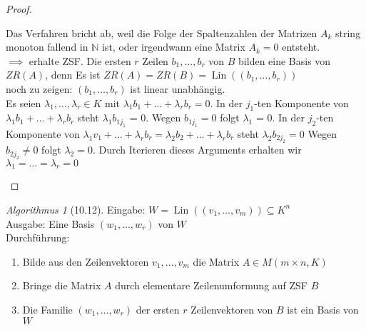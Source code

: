 \documentclass[a4paper]{scrartcl}
\DeclareMathOperator{\Lin}{Lin}
\theoremstyle{definition}
\theoremstyle{plain}
\theoremstyle{plain}
\theoremstyle{remark}
\theoremstyle{remark}
\theoremstyle{remark}
\theoremstyle{remark}
\newtheorem{algorithm}{Algorithmus}
\theoremstyle{remark}
\begin{document}
\begin{proof}
\begin{enumerate}
\begin{enumerate}
Das Verfahren bricht ab, weil die Folge der Spaltenzahlen der Matrizen $A_k$ string monoton fallend in $\mathbb{N}$ ist, oder irgendwann eine Matrix $A_k = 0$ entsteht. \\
                $\implies$ erhalte ZSF.
Die ersten $r$ Zeilen $b_1, \ldots, b_r$ von $B$ bilden eine Basis von $ZR(A)$, denn Es ist $ZR(A) = ZR(B) = \Lin((b_1, \ldots, b_r))$ \\
                noch zu zeigen: $(b_1, \ldots, b_r)$ ist linear unabhängig. \\
                Es seien $\lambda_1, \dots, \lambda_r \in K$ mit $\lambda_1 b_1 + \ldots + \lambda_r b_r = 0$. In der $j_1$-ten Komponente von $\lambda_1 b_1 + \ldots + \lambda_r b_r$ steht $\lambda_1 b_{1 j_1}$ = 0.
Wegen $b_{1 j_1} = 0$ folgt $\lambda_1$ = 0.
In der $j_2$-ten Komponente von $\lambda_1 v_1 + \ldots + \lambda_r b_r = \lambda_2 b_2 + \ldots + \lambda_r b_r$ steht $\lambda_2 b_{2 j_2} = 0$
Wegen $b_{2 j_2} \neq 0$ folgt $\lambda_2 = 0$.
Durch Iterieren dieses Arguments erhalten wir $\lambda_1 = \ldots = \lambda_r = 0$
\end{enumerate}
\end{enumerate}
\end{proof}
\begin{algorithm}[10.12]
Eingabe: $W = \Lin((v_1, \ldots, v_m)) \subseteq K^n$ \\
  Ausgabe: Eine Basis $(w_1, \ldots, w_r)$ von $W$ \\
  Durchführung: \\
\begin{enumerate}
\item Bilde aus den Zeilenvektoren $v_1, \ldots, v_m$ die Matrix $A\in M(m\times n, K)$
\item Bringe die Matrix $A$ durch elementare Zeilenumformung auf ZSF $B$
\item Die Familie $(w_1, \ldots, w_r)$ der ersten $r$ Zeilenvektoren von $B$ ist ein Basis von $W$
\end{enumerate}
\end{algorithm}
\end{document}
